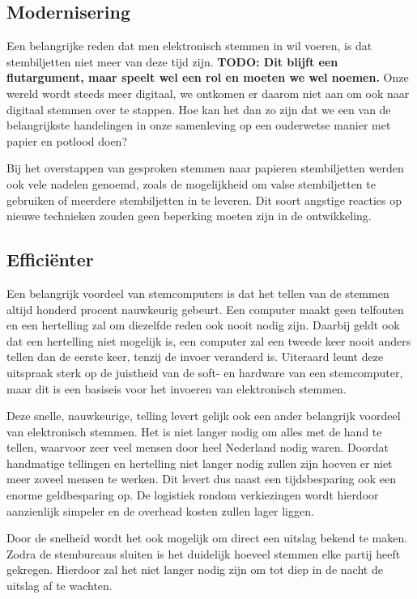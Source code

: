 \documentclass[a4paper]{article}
\newcommand{\TODO}[1]{{\color{red}\textbf{TODO: #1}}}
\begin{document}
\subsection{Modernisering}
Een belangrijke reden dat men elektronisch stemmen in wil voeren, is dat stembiljetten niet meer van deze tijd zijn.
\TODO {Dit blijft een flutargument, maar speelt wel een rol en moeten we wel noemen.}
Onze wereld wordt steeds meer digitaal, we ontkomen er daarom niet aan om ook naar digitaal stemmen over te stappen.
Hoe kan het dan zo zijn dat we een van de belangrijkste handelingen in onze samenleving op een ouderwetse manier met papier en potlood doen?

Bij het overstappen van gesproken stemmen naar papieren stembiljetten werden ook vele nadelen genoemd, zoals de mogelijkheid om valse stembiljetten te gebruiken of meerdere stembiljetten in te leveren.
Dit soort angstige reacties op nieuwe technieken zouden geen beperking moeten zijn in de ontwikkeling.

\subsection{Effici{\"e}nter}
Een belangrijk voordeel van stemcomputers is dat het tellen van de stemmen altijd honderd procent nauwkeurig gebeurt.
Een computer maakt geen telfouten en een hertelling zal om diezelfde reden ook nooit nodig zijn.
Daarbij geldt ook dat een hertelling niet mogelijk is, een computer zal een tweede keer nooit anders tellen dan de eerste keer, tenzij de invoer veranderd is.
Uiteraard leunt deze uitspraak sterk op de juistheid van de soft- en hardware van een stemcomputer, maar dit is een basiseis voor het invoeren van elektronisch stemmen.

Deze snelle, nauwkeurige, telling levert gelijk ook een ander belangrijk voordeel van elektronisch stemmen.
Het is niet langer nodig om alles met de hand te tellen, waarvoor zeer veel mensen door heel Nederland nodig waren.
Doordat handmatige tellingen en hertelling niet langer nodig zullen zijn hoeven er niet meer zoveel mensen te werken.
Dit levert dus naast een tijdsbesparing ook een enorme geldbesparing op.
De logistiek rondom verkiezingen wordt hierdoor aanzienlijk simpeler en de overhead kosten zullen lager liggen.

Door de snelheid wordt het ook mogelijk om direct een uitslag bekend te maken.
Zodra de stembureaus sluiten is het duidelijk hoeveel stemmen elke partij heeft gekregen.
Hierdoor zal het niet langer nodig zijn om tot diep in de nacht de uitslag af te wachten.
\end{document}
